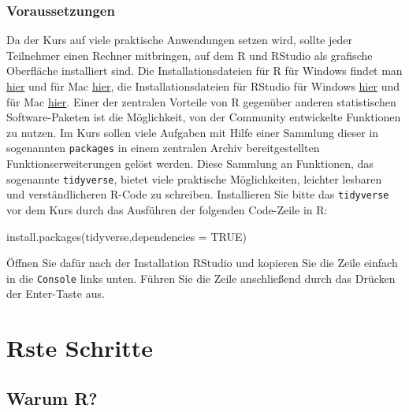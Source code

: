 \documentclass[
]{book}
\newenvironment{Shaded}{\begin{snugshade}}{\end{snugshade}}
\newcommand{\AttributeTok}[1]{\textcolor[rgb]{0.77,0.63,0.00}{#1}}
\newcommand{\ConstantTok}[1]{\textcolor[rgb]{0.00,0.00,0.00}{#1}}
\newcommand{\FunctionTok}[1]{\textcolor[rgb]{0.00,0.00,0.00}{#1}}
\newcommand{\NormalTok}[1]{#1}
\newcommand{\StringTok}[1]{\textcolor[rgb]{0.31,0.60,0.02}{#1}}
\begin{document}
\hypertarget{voraussetzungen}{%
\subsection{Voraussetzungen}\label{voraussetzungen}}

Da der Kurs auf viele praktische Anwendungen setzen wird, sollte jeder Teilnehmer einen Rechner mitbringen, auf dem R und RStudio als grafische Oberfläche installiert sind.
Die Installationsdateien für R für Windows findet man \href{https://cran.r-project.org/bin/windows/base/R-4.0.3-win.exe}{hier} und für Mac \href{https://cran.r-project.org/bin/macosx/R-4.0.3.pkg}{hier}, die Installationsdateien für RStudio für Windows \href{https://download1.rstudio.org/desktop/windows/RStudio-1.3.1093.exe}{hier} und für Mac \href{https://download1.rstudio.org/desktop/macos/RStudio-1.3.1093.dmg}{hier}.
Einer der zentralen Vorteile von R gegenüber anderen statistischen Software-Paketen ist die Möglichkeit, von der Community entwickelte Funktionen zu nutzen. Im Kurs sollen viele Aufgaben mit Hilfe einer Sammlung dieser in sogenannten \texttt{packages} in einem zentralen Archiv bereitgestellten Funktionserweiterungen gelöst werden. Diese Sammlung an Funktionen, das sogenannte \texttt{tidyverse}, bietet viele praktische Möglichkeiten, leichter lesbaren und verständlicheren R-Code zu schreiben.
Installieren Sie bitte das \texttt{tidyverse} vor dem Kurs durch das Ausführen der folgenden Code-Zeile in R:

\begin{Shaded}
\begin{Highlighting}[]
\FunctionTok{install.packages}\NormalTok{(}\StringTok{\textquotesingle{}tidyverse\textquotesingle{}}\NormalTok{,}\AttributeTok{dependencies =} \ConstantTok{TRUE}\NormalTok{)}
\end{Highlighting}
\end{Shaded}

Öffnen Sie dafür nach der Installation RStudio und kopieren Sie die Zeile einfach in die \texttt{Console} links unten.
Führen Sie die Zeile anschließend durch das Drücken der Enter-Taste aus.

\hypertarget{rste-schritte}{%
\chapter{Rste Schritte}\label{rste-schritte}}

\hypertarget{warum-r}{%
\section{Warum R?}\label{warum-r}}
\end{document}

